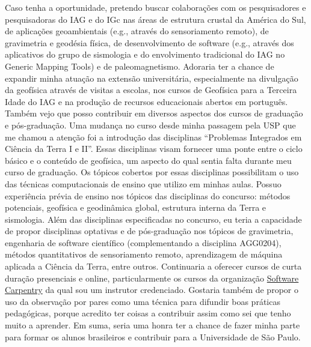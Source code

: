 \documentclass[12pt,a4paper,oneside]{book}
\newcommand{\USP}{Universidade de São Paulo}
\begin{document}
Caso tenha a oportunidade, pretendo buscar colaborações com os pesquisadores e
pesquisadoras do IAG e do IGc nas áreas de estrutura crustal da América do Sul,
de aplicações geoambientais (e.g., através do sensoriamento remoto), de
gravimetria e geodésia física, de desenvolvimento de software (e.g., através
dos aplicativos do grupo de sismologia e do envolvimento tradicional do IAG no
Generic Mapping Tools) e de paleomagnetismo.
Adoraria ter a chance de expandir minha atuação na extensão universitária,
especialmente na divulgação da geofísica através de visitas a escolas, nos
cursos de Geofísica para a Terceira Idade do IAG e na produção de recursos
educacionais abertos em português.
Também vejo que posso contribuir em diversos aspectos dos cursos de graduação
e pós-graduação.
Uma mudança no curso desde minha passagem pela USP que me chamou a atenção foi
a introdução das disciplinas ``Problemas Integrados em Ciência da Terra I e
II''.
Essas disciplinas visam fornecer uma ponte entre o ciclo básico e o conteúdo de
geofísica, um aspecto do qual sentia falta durante meu curso de graduação.
Os tópicos cobertos por essas disciplinas possibilitam o uso das técnicas
computacionais de ensino que utilizo em minhas aulas.
Possuo experiência prévia de ensino nos tópicos das disciplinas do concurso:
métodos potenciais, geofísica e geodinâmica global, estrutura interna da Terra
e sismologia.
Além das disciplinas especificadas no concurso, eu teria a capacidade de
propor disciplinas optativas e de pós-graduação nos tópicos de gravimetria,
engenharia de software científico (complementando a disciplina AGG0204),
métodos quantitativos de sensoriamento remoto, aprendizagem de máquina aplicada
a Ciência da Terra, entre outros.
Continuaria a oferecer cursos de curta duração presenciais e online,
particularmente os cursos da organização
\href{https://softwareunderground.org/}{Software Carpentry} da qual sou um
instrutor credenciado.
Gostaria também de propor o uso da observação por pares como uma técnica para
difundir boas práticas pedagógicas, porque acredito ter coisas a
contribuir assim como sei que tenho muito a aprender.
Em suma, seria uma honra ter a chance de fazer minha parte para formar os
alunos brasileiros e contribuir para a \USP{}.


\backmatter


\end{document}
